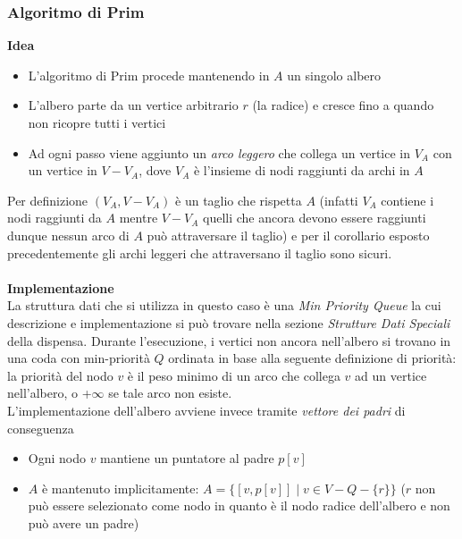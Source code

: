 \documentclass[../cheatSheetAlgoritmi.tex]{subfiles}
\begin{document}
\subsubsection{Algoritmo di Prim}
\textbf{Idea}
\begin{itemize}
	\item L'algoritmo di Prim procede mantenendo in $A$ un singolo albero
	\item L'albero parte da un vertice arbitrario $r$ (la radice) e cresce fino a quando non ricopre tutti i vertici
	\item Ad ogni passo viene aggiunto un \emph{arco leggero} che collega un vertice in $V_{A}$ con un vertice in $V - V_{A}$, dove $V_{A}$ è l'insieme di nodi raggiunti da archi in $A$
\end{itemize}
Per definizione $(V_{A}, V - V_{A})$ è un taglio che rispetta $A$ (infatti $V_{A}$ contiene i nodi raggiunti da $A$ mentre $V-V_{A}$ quelli che ancora devono essere raggiunti dunque nessun arco di $A$ può attraversare il taglio) e per il corollario esposto precedentemente gli archi leggeri che attraversano il taglio sono sicuri.\\\\
\textbf{Implementazione}\\
La struttura dati che si utilizza in questo caso è una \emph{Min Priority Queue} la cui descrizione e implementazione si può trovare nella sezione \emph{Strutture Dati Speciali} della dispensa. Durante l'esecuzione, i vertici non ancora nell'albero si trovano in una coda con min-priorità $Q$ ordinata in base alla seguente definizione di priorità: la priorità del nodo $v$ è il peso minimo di un arco che collega $v$ ad un vertice nell'albero, o +$\infty$ se tale arco non esiste.\\
L'implementazione dell'albero avviene invece tramite \emph{vettore dei padri} di conseguenza
\begin{itemize}
	\item Ogni nodo $v$ mantiene un puntatore al padre $p[v]$
	\item $A$ è mantenuto implicitamente: $A = \{[v, p[v]] \mid v \in V - Q - \{r\}\}$ ($r$ non può essere selezionato come nodo in quanto è il nodo radice dell'albero e non può avere un padre)
\end{itemize}
\end{document}
